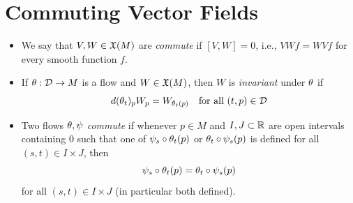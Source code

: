 \section{Commuting Vector Fields}
\begin{definition}
\begin{itemize}
    \item We say that $V,W \in \frak{X}(M)$ are \textit{commute} if $[V,W] = 0$, i.e., $VWf = WVf$ for every smooth function $f$. 
    \item If $\theta:\mathcal{D} \to M$ is a flow and $W \in \frak{X}(M)$, then $W$ is \textit{invariant} under $\theta$ if \begin{equation}
        d(\theta_t)_p W_p = W_{\theta_t(p)} \quad \text{for all }(t,p) \in \mathcal{D}
    \end{equation}
    \item Two flows $\theta, \psi$ \textit{commute} if whenever $p \in M$ and $I,J \subset \mathbb{R}$ are open intervals containing $0$ such that one of $\psi_s \circ \theta_t(p)$ or $\theta_t \circ \psi_s(p)$ is defined for all $(s,t) \in I \times J$, then 
    $$\psi_s \circ \theta_t(p) = \theta_t \circ \psi_s(p) $$ for all $(s,t) \in I \times J$ (in particular both defined). 
\end{itemize}
\end{definition}

